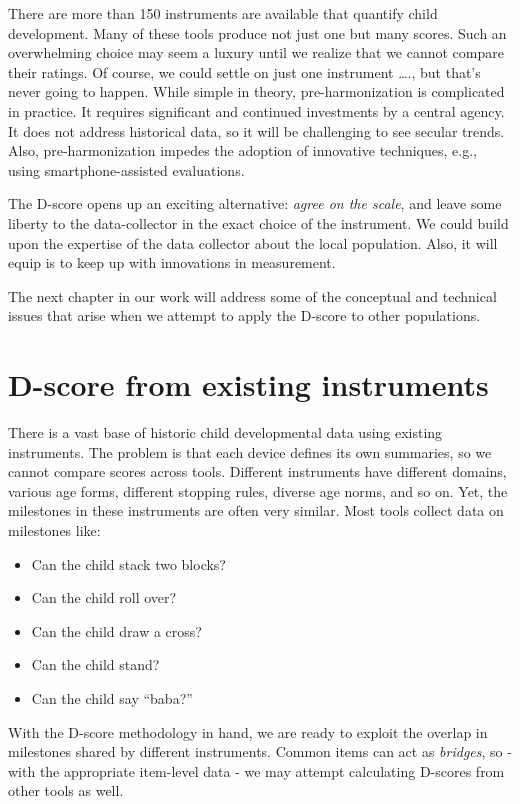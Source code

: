 \documentclass[
]{book}
\providecommand{\tightlist}{%
  \setlength{\itemsep}{0pt}\setlength{\parskip}{0pt}}
\begin{document}
There are more than 150 instruments are available that quantify child development. Many of these tools produce not just one but many scores. Such an overwhelming choice may seem a luxury until we realize that we cannot compare their ratings. Of course, we could settle on just one instrument \ldots., but that's never going to happen. While simple in theory, pre-harmonization is complicated in practice. It requires significant and continued investments by a central agency. It does not address historical data, so it will be challenging to see secular trends. Also, pre-harmonization impedes the adoption of innovative techniques, e.g., using smartphone-assisted evaluations.

The D-score opens up an exciting alternative: \emph{agree on the scale}, and leave some liberty to the data-collector in the exact choice of the instrument. We could build upon the expertise of the data collector about the local population. Also, it will equip is to keep up with innovations in measurement.

The next chapter in our work will address some of the conceptual and technical issues that arise when we attempt to apply the D-score to other populations.

\hypertarget{d-score-from-existing-instruments}{%
\section{D-score from existing instruments}\label{d-score-from-existing-instruments}}

There is a vast base of historic child developmental data using existing instruments. The problem is that each device defines its own summaries, so we cannot compare scores across tools. Different instruments have different domains, various age forms, different stopping rules, diverse age norms, and so on. Yet, the milestones in these instruments are often very similar. Most tools collect data on milestones like:

\begin{itemize}
\tightlist
\item
  Can the child stack two blocks?
\item
  Can the child roll over?
\item
  Can the child draw a cross?
\item
  Can the child stand?
\item
  Can the child say ``baba?''
\end{itemize}

With the D-score methodology in hand, we are ready to exploit the overlap in milestones shared by different instruments. Common items can act as \emph{bridges}, so - with the appropriate item-level data - we may attempt calculating D-scores from other tools as well.
\end{document}
